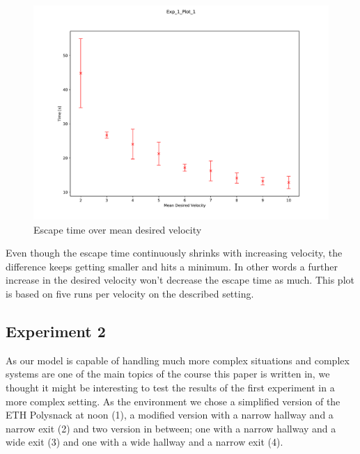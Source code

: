 \documentclass[11pt]{article}
\begin{document}
\begin{figure}[H]
	\centering
	\includegraphics[width=.75\linewidth]{assets/Exp_1_Plot_1}\\
	Escape time over mean desired velocity
\end{figure}

Even though the escape time continuously shrinks with increasing velocity, the difference keeps getting smaller and hits a minimum. In other words a further increase in the desired velocity won't  decrease the escape time as much. This plot is based on five runs per velocity on the described setting.


\subsection{Experiment 2}

As our model is capable of handling much more complex situations and complex systems are one of the main topics of the course this paper is written in, we  thought it might be interesting to test the results of the first experiment in a more complex setting. As the environment we chose a simplified version of the ETH Polysnack at noon (1), a modified version with a narrow hallway and a narrow exit (2) and two version in between; one with a narrow hallway and a wide exit (3) and one with a wide hallway and a narrow exit (4).
\end{document}
